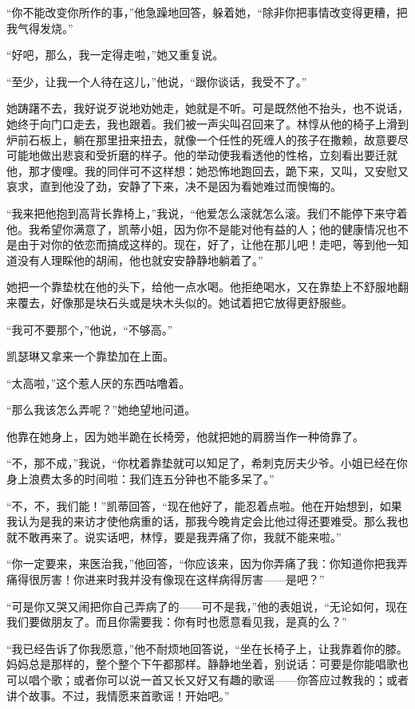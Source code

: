 \par “你不能改变你所作的事，”他急躁地回答，躲着她，“除非你把事情改变得更糟，把我气得发烧。”
\par “好吧，那么，我一定得走啦，”她又重复说。
\par “至少，让我一个人待在这儿，”他说，“跟你谈话，我受不了。”
\par 她踌躇不去，我好说歹说地劝她走，她就是不听。可是既然他不抬头，也不说话，她终于向门口走去，我也跟着。我们被一声尖叫召回来了。林惇从他的椅子上滑到炉前石板上，躺在那里扭来扭去，就像一个任性的死缠人的孩子在撒赖，故意要尽可能地做出悲哀和受折磨的样子。他的举动使我看透他的性格，立刻看出要迁就他，那才傻哩。我的同伴可不这样想：她恐怖地跑回去，跪下来，又叫，又安慰又哀求，直到他没了劲，安静了下来，决不是因为看她难过而懊悔的。
\par “我来把他抱到高背长靠椅上，”我说，“他爱怎么滚就怎么滚。我们不能停下来守着他。我希望你满意了，凯蒂小姐，因为你不是能对他有益的人；他的健康情况也不是由于对你的依恋而搞成这样的。现在，好了，让他在那儿吧！走吧，等到他一知道没有人理睬他的胡闹，他也就安安静静地躺着了。”
\par 她把一个靠垫枕在他的头下，给他一点水喝。他拒绝喝水，又在靠垫上不舒服地翻来覆去，好像那是块石头或是块木头似的。她试着把它放得更舒服些。
\par “我可不要那个，”他说，“不够高。”
\par 凯瑟琳又拿来一个靠垫加在上面。
\par “太高啦，”这个惹人厌的东西咕噜着。
\par “那么我该怎么弄呢？”她绝望地问道。
\par 他靠在她身上，因为她半跪在长椅旁，他就把她的肩膀当作一种倚靠了。
\par “不，那不成，”我说，“你枕着靠垫就可以知足了，希刺克厉夫少爷。小姐已经在你身上浪费太多的时间啦：我们连五分钟也不能多呆了。”
\par “不，不，我们能！”凯蒂回答，“现在他好了，能忍着点啦。他在开始想到，如果我认为是我的来访才使他病重的话，那我今晚肯定会比他过得还要难受。那么我也就不敢再来了。说实话吧，林惇，要是我弄痛了你，我就不能来啦。”
\par “你一定要来，来医治我，”他回答，“你应该来，因为你弄痛了我：你知道你把我弄痛得很厉害！你进来时我并没有像现在这样病得厉害——是吧？”
\par “可是你又哭又闹把你自己弄病了的——可不是我，”他的表姐说，“无论如何，现在我们要做朋友了。而且你需要我：你有时也愿意看见我，是真的么？”
\par “我已经告诉了你我愿意，”他不耐烦地回答说，“坐在长椅子上，让我靠着你的膝。妈妈总是那样的，整个整个下午都那样。静静地坐着，别说话：可要是你能唱歌也可以唱个歌；或者你可以说一首又长又好又有趣的歌谣——你答应过教我的；或者讲个故事。不过，我情愿来首歌谣！开始吧。”
